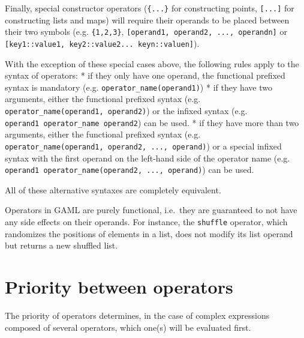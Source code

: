 \documentclass[]{book}
\theoremstyle{definition}
\theoremstyle{definition}
\theoremstyle{definition}
\theoremstyle{remark}
\begin{document}
Finally, special constructor operators (\texttt{\{...\}} for
constructing points, \texttt{{[}...{]}} for constructing lists and maps)
will require their operands to be placed between their two symbols (e.g.
\texttt{\{1,2,3\}}, \texttt{{[}operand1,\ operand2,\ ...,\ operandn{]}}
or \texttt{{[}key1::value1,\ key2::value2...\ keyn::valuen{]}}).

With the exception of these special cases above, the following rules
apply to the syntax of operators: * if they only have one operand, the
functional prefixed syntax is mandatory (e.g.
\texttt{operator\_name(operand1)}) * if they have two arguments, either
the functional prefixed syntax (e.g.
\texttt{operator\_name(operand1,\ operand2)}) or the infixed syntax
(e.g. \texttt{operand1\ operator\_name\ operand2}) can be used. * if
they have more than two arguments, either the functional prefixed syntax
(e.g. \texttt{operator\_name(operand1,\ operand2,\ ...,\ operand)}) or a
special infixed syntax with the first operand on the left-hand side of
the operator name (e.g.
\texttt{operand1\ operator\_name(operand2,\ ...,\ operand)}) can be
used.

All of these alternative syntaxes are completely equivalent.

Operators in GAML are purely functional, i.e.~they are guaranteed to not
have any side effects on their operands. For instance, the
\texttt{shuffle} operator, which randomizes the positions of elements in
a list, does not modify its list operand but returns a new shuffled
list.

\section{\texorpdfstring{}{ }}\label{section-23}

\section{Priority between operators}\label{priority-between-operators-5}

The priority of operators determines, in the case of complex expressions
composed of several operators, which one(s) will be evaluated first.
\end{document}
